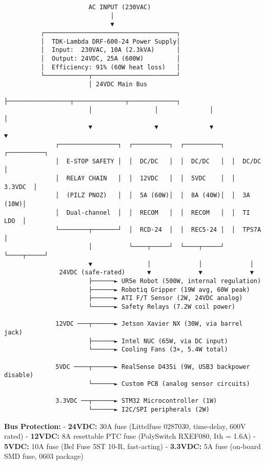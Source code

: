 \documentclass[
]{article}
\begin{document}
\begin{verbatim}
                       AC INPUT (230VAC)
                             │
                             ▼
          ┌────────────────────────────────────┐
          │  TDK-Lambda DRF-600-24 Power Supply│
          │  Input:  230VAC, 10A (2.3kVA)      │
          │  Output: 24VDC, 25A (600W)         │
          │  Efficiency: 91% (60W heat loss)   │
          └────────────┬───────────────────────┘
                       │ 24VDC Main Bus
                       ├─────────────────┬──────────────┬─────────────┐
                       │                 │              │             │
                       ▼                 ▼              ▼             ▼
              ┌────────────────┐  ┌──────────┐  ┌──────────┐  ┌──────────┐
              │  E-STOP SAFETY │  │  DC/DC   │  │  DC/DC   │  │  DC/DC   │
              │  RELAY CHAIN   │  │  12VDC   │  │  5VDC    │  │  3.3VDC  │
              │  (PILZ PNOZ)   │  │  5A (60W)│  │  8A (40W)│  │  3A (10W)│
              │  Dual-channel  │  │  RECOM   │  │  RECOM   │  │  TI LDO  │
              └────────┬───────┘  │  RCD-24  │  │  REC5-24 │  │  TPS7A  │
                       │          └────┬─────┘  └────┬─────┘  └────┬─────┘
                       ▼               │             │             │
               24VDC (safe-rated)      ▼             ▼             ▼
                       ├──────► UR5e Robot (500W, internal regulation)
                       ├──────► Robotiq Gripper (19W avg, 60W peak)
                       ├──────► ATI F/T Sensor (2W, 24VDC analog)
                       └──────► Safety Relays (7.2W coil power)

              12VDC ───┬──────► Jetson Xavier NX (30W, via barrel jack)
                       ├──────► Intel NUC (65W, via DC input)
                       └──────► Cooling Fans (3×, 5.4W total)

              5VDC ────┬──────► RealSense D435i (9W, USB3 backpower disable)
                       └──────► Custom PCB (analog sensor circuits)

              3.3VDC ──┬──────► STM32 Microcontroller (1W)
                       └──────► I2C/SPI peripherals (2W)
\end{verbatim}

\textbf{Bus Protection:} - \textbf{24VDC:} 30A fuse (Littelfuse 0287030,
time-delay, 600V rated) - \textbf{12VDC:} 8A resettable PTC fuse
(PolySwitch RXEF080, Ith = 1.6A) - \textbf{5VDC:} 10A fuse (Bel Fuse 5ST
10-R, fast-acting) - \textbf{3.3VDC:} 5A fuse (on-board SMD fuse, 0603
package)
\end{document}
